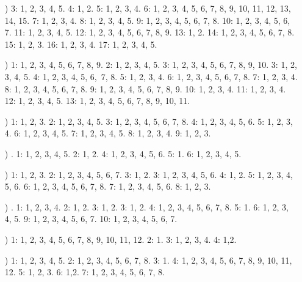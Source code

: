 \documentclass[a4paper,11pt]{article}
\numberwithin{equation}{section}
\begin{document}
\begin{itemize}

\item[\romannumeral1)] 3: 1, 2, 3, 4, 5. 4: 1, 2. 5: 1, 2, 3, 4. 6: 1, 2,
  3, 4, 5, 6, 7, 8, 9, 10, 11, 12, 13, 14, 15. 7: 1, 2, 3, 4.
  8: 1, 2, 3, 4, 5. 9: 1, 2, 3, 4, 5, 6, 7, 8. 10: 1, 2, 3, 4, 5, 6, 7.
  11: 1, 2, 3, 4, 5. 12: 1, 2, 3, 4, 5, 6, 7, 8, 9. 13: 1, 2.
  14: 1, 2, 3, 4, 5, 6, 7, 8. 15: 1, 2, 3. 16: 1, 2, 3, 4. 17: 1, 2, 3, 4, 5.

\item[\romannumeral2)] 1: 1, 2, 3, 4, 5, 6, 7, 8, 9. 2: 1, 2, 3, 4, 5.
  3: 1, 2, 3, 4, 5, 6, 7, 8, 9, 10. 3: 1, 2, 3, 4, 5. 4: 1, 2, 3, 4, 5, 6,\
  7, 8. 5: 1, 2, 3, 4. 6: 1, 2, 3, 4, 5, 6, 7, 8. 7: 1, 2, 3, 4.
  8: 1, 2, 3, 4, 5, 6, 7, 8. 9: 1, 2, 3, 4, 5, 6, 7, 8, 9. 10: 1, 2, 3, 4.
  11: 1, 2, 3, 4. 12: 1, 2, 3, 4, 5. 13: 1, 2, 3, 4, 5, 6, 7, 8, 9, 10, 11.

\item[\romannumeral3)] 1: 1, 2, 3. 2: 1, 2, 3, 4, 5. 3: 1, 2, 3, 4, 5, 6, 7,
  8. 4: 1, 2, 3, 4, 5, 6. 5: 1, 2, 3, 4. 6: 1, 2, 3, 4, 5. 7: 1, 2, 3, 4,
  5. 8: 1, 2, 3, 4. 9: 1, 2, 3.

\item[\romannumeral4)] . 1: 1, 2, 3, 4, 5. 2: 1, 2. 4: 1, 2, 3, 4, 5, 6.
  5: 1. 6: 1, 2, 3, 4, 5.

\item[\romannumeral5)] 1: 1, 2, 3. 2: 1, 2, 3, 4, 5, 6, 7. 3: 1, 2.
  3: 1, 2, 3, 4, 5, 6. 4: 1, 2. 5: 1, 2, 3, 4, 5, 6.
  6: 1, 2, 3, 4, 5, 6, 7, 8. 7: 1, 2, 3, 4, 5, 6. 8: 1, 2, 3.

\item[\romannumeral6)] . 1: 1, 2, 3, 4. 2: 1, 2. 3: 1, 2. 3: 1, 2.
  4: 1, 2, 3, 4, 5, 6, 7, 8. 5: 1. 6: 1, 2, 3, 4, 5. 9: 1, 2, 3, 4, 5, 6,
  7. 10: 1, 2, 3, 4, 5, 6, 7.

\item[\romannumeral7)] 1: 1, 2, 3, 4, 5, 6, 7, 8, 9, 10, 11, 12. 2: 1.
  3: 1, 2, 3, 4. 4: 1,2.

\item[\romannumeral8)] 1: 1, 2, 3, 4, 5. 2: 1, 2, 3, 4, 5, 6, 7, 8.
  3: 1. 4: 1, 2, 3, 4, 5, 6, 7, 8, 9, 10, 11, 12. 5: 1, 2, 3. 6: 1,2.
  7: 1, 2, 3, 4, 5, 6, 7, 8.

\end{itemize}
\end{document}
